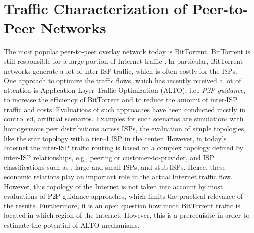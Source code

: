 \section{Traffic Characterization of Peer-to-Peer Networks}\label{sec:aslevel:p2p}

The most popular peer-to-peer overlay network today is BitTorrent.
BitTorrent is still responsible for a large portion of Internet traffic \cite{cisco2016,wamser2010}. In particular, BitTorrent networks generate a lot of inter-ISP traffic, which is often costly for the ISPs. One approach to optimize the traffic flows, which has recently received a lot of attention is Application Layer Traffic Optimization (ALTO), i.e., \textit{P2P guidance}, to increase the efficiency of BitTorrent and to reduce the amount of inter-ISP traffic and costs. Evaluations of such approaches have been conducted mostly in controlled, artificial scenarios. Examples for such scenarios are simulations with homogeneous peer distributions across ISPs, the evaluation of simple topologies, like the star topology with a tier--1 ISP in the center. However, in today's Internet the inter-ISP traffic routing is based on a complex topology defined by inter-ISP relationships, e.g., peering or customer-to-provider, and ISP classifications such as \tier, large and small ISPs, and stub ISPs. Hence, these economic relations play an important role in the actual Internet traffic flow. However, this topology of the Internet is not taken into account by most evaluations of P2P guidance approaches, which limits the practical relevance of the results. Furthermore, it is an open question how much BitTorrent traffic is located in which region of the Internet. However, this is a prerequisite in order to estimate the potential of ALTO mechanisms.

